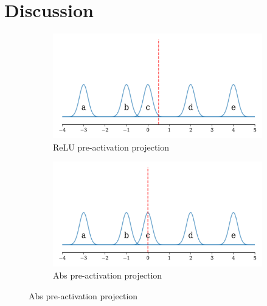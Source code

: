 \section{Discussion}

\begin{figure}[ht]
    \centering

    \begin{subfigure}[b]{0.49\textwidth}
    \centering
    \includegraphics[width=\textwidth]{images/activation_demo_relu_pre}
    \caption{ReLU pre-activation projection}
    \label{fig:relu_pre}
    \end{subfigure}
    \hfill
    \begin{subfigure}[b]{0.49\textwidth}
    \centering
    \includegraphics[width=\textwidth]{images/activation_demo_abs_pre}
    \caption{Abs pre-activation projection}
    \label{fig:abs_pre}
    \end{subfigure}


\end{figure}
